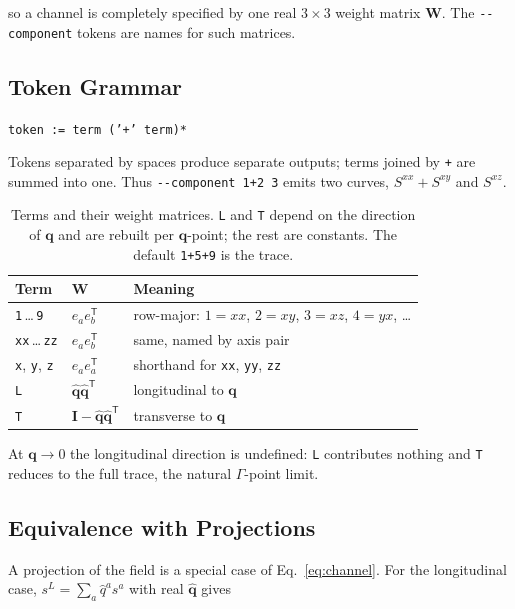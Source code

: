 \documentclass[12pt, a4paper, oneside]{article}
\newcommand{\qvec}{\mathbf{q}}
\newcommand{\qhat}{\hat{\mathbf{q}}}
\newcommand{\Wmat}{\mathbf{W}}
\begin{document}
so a channel is completely specified by one real $3\times3$ weight matrix
$\Wmat$. The \texttt{-\/-component} tokens are names for such matrices.

\subsection{Token Grammar}

\begin{center}
\texttt{token := term ('+' term)*}
\end{center}

Tokens separated by spaces produce separate outputs; terms joined by \texttt{+}
are summed into one. Thus \texttt{-\/-component 1+2 3} emits two curves,
$S^{xx}+S^{xy}$ and $S^{xz}$.

\begin{table}[h]
    \centering
    \begin{tabular}{lll}
        \toprule
        Term & $\Wmat$ & Meaning \\
        \midrule
        \texttt{1}\,\dots\,\texttt{9} & $e_ae_b^{\mathsf T}$ & row-major: $1=xx$, $2=xy$, $3=xz$, $4=yx$, \dots \\
        \texttt{xx}\,\dots\,\texttt{zz} & $e_ae_b^{\mathsf T}$ & same, named by axis pair \\
        \texttt{x}, \texttt{y}, \texttt{z} & $e_ae_a^{\mathsf T}$ & shorthand for \texttt{xx}, \texttt{yy}, \texttt{zz} \\
        \texttt{L} & $\qhat\qhat^{\mathsf T}$ & longitudinal to $\qvec$ \\
        \texttt{T} & $\mathbf{I}-\qhat\qhat^{\mathsf T}$ & transverse to $\qvec$ \\
        \bottomrule
    \end{tabular}
    \caption{Terms and their weight matrices. \texttt{L} and \texttt{T} depend
    on the direction of $\qvec$ and are rebuilt per $\qvec$-point; the rest are
    constants. The default \texttt{1+5+9} is the trace.}
\end{table}

At $\qvec\to0$ the longitudinal direction is undefined: \texttt{L} contributes
nothing and \texttt{T} reduces to the full trace, the natural $\Gamma$-point
limit.

\subsection{Equivalence with Projections}

A projection of the field is a special case of Eq.~\eqref{eq:channel}. For the
longitudinal case, $s^L = \sum_a\hat q^a s^a$ with real $\qhat$ gives
\end{document}
